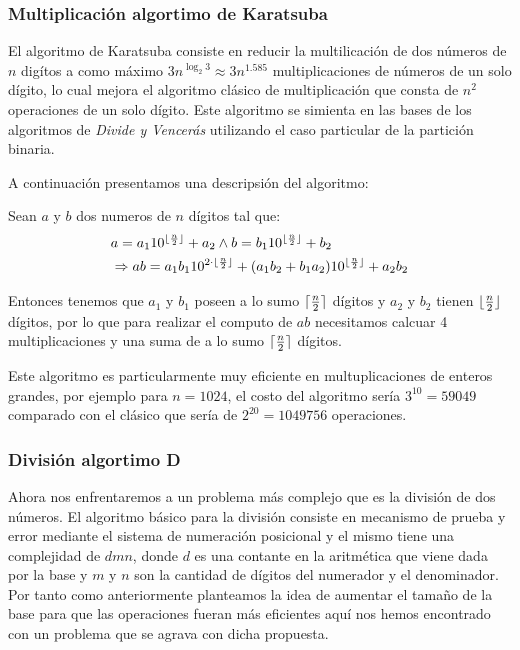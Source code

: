 \documentclass[a4paper,10pt,twocolumn]{article}
\begin{document}
\subsubsection{Multiplicación algortimo de Karatsuba}\label{sub:multiplication}
	El algoritmo de Karatsuba consiste en reducir la multilicación de dos números de $n$ digítos a como máximo 
	$3n^{\log_2 3}\approx 3n^{1.585}$ multiplicaciones de números de un solo dígito, lo cual mejora el algoritmo clásico de multiplicación que consta de $n^2$ operaciones de un solo dígito. Este algoritmo se simienta en las bases de los algoritmos de \emph{Divide y Vencerás} utilizando el caso particular de la partición binaria.
	
	A continuación presentamos una descripsión del algoritmo:
	
	Sean $a$ y $b$ dos numeros de $n$ dígitos tal que:
		\begin{equation}
			\begin{split}
				&a=a_1 10^{\lfloor {n\over 2}\rfloor} + a_2 \wedge b=b_1 10^{\lfloor {n\over 2}\rfloor} + b_2	\\	
				&\Rightarrow ab=a_1 b_1 10^{2\cdot\lfloor {n\over 2}\rfloor}+(a_1 b_2+b_1 a_2 )10^{\lfloor {n\over 2}\rfloor}+a_2 b_2
			\end{split}
		\end{equation}			
			
	 Entonces tenemos que $a_1$ y $b_1$ poseen a lo sumo $\lceil {n\over 2}\rceil$ dígitos y $a_2$ y $b_2$ tienen $\lfloor {n\over 2}\rfloor$ dígitos, por lo que para realizar el computo de $ab$ necesitamos calcuar 4 multiplicaciones y una suma de a lo sumo $\lceil {n\over 2}\rceil$ dígitos.
	 
	 Este algoritmo es particularmente muy eficiente en multuplicaciones de enteros grandes, por ejemplo para $n=1024$, el costo del algoritmo sería $3^{10}=59049$ comparado con el clásico que sería de $2^{20}=1049756$ operaciones. 
	
	
\subsubsection{División algortimo D}\label{sub:division}
	Ahora nos enfrentaremos a un problema más complejo que es la división de dos números. El algoritmo básico para la división consiste en mecanismo de prueba y error mediante el sistema de numeración posicional y el mismo tiene una complejidad de $d m n$, donde $d$ es una contante en la aritmética que viene dada por la base y $m$ y $n$ son la cantidad de dígitos del numerador y el denominador. Por tanto como anteriormente planteamos la idea de aumentar el tamaño de la base para que las operaciones fueran más eficientes aquí nos hemos encontrado con un problema que se agrava con dicha propuesta.
	
\end{document}
